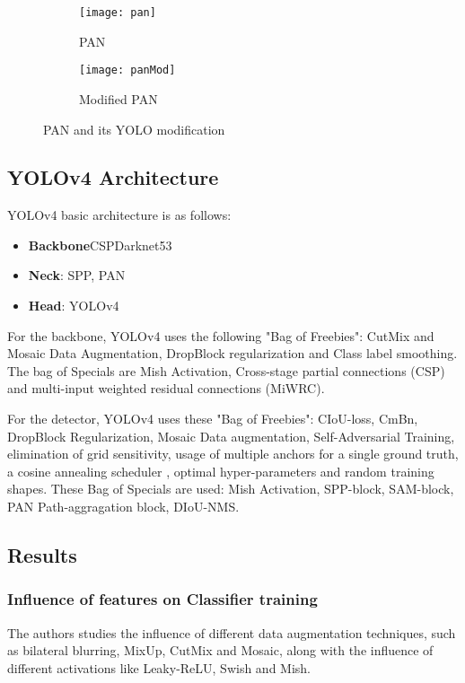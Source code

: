 \begin{figure}[H]
     \centering
     \begin{subfigure}[b]{0.3\textwidth}
         \centering
         \texttt{[image: pan]}
         \caption{PAN}
         \label{fig:pan}
     \end{subfigure}
     \begin{subfigure}[b]{0.3\textwidth}
         \centering
         \texttt{[image: panMod]}
         \caption{Modified PAN}
         \label{fig:panmod}
     \end{subfigure}
   \caption{PAN and its YOLO modification}
   \label{fig:PAN}
\end{figure}
\subsection{YOLOv4 Architecture}
YOLOv4 basic architecture is as follows:
\begin{itemize}
	\item \textbf{Backbone}CSPDarknet53\cite{CSPDarknet53}
	\item \textbf{Neck}: SPP, PAN
	\item \textbf{Head}: YOLOv4
\end{itemize}

 
For the backbone, YOLOv4 uses the following "Bag of Freebies": CutMix and Mosaic Data Augmentation, DropBlock regularization and Class label smoothing. The bag of Specials are Mish Activation, Cross-stage partial connections (CSP) and multi-input weighted residual connections (MiWRC).

For the detector, YOLOv4 uses these "Bag of Freebies": CIoU-loss, CmBn, DropBlock Regularization, Mosaic Data augmentation, Self-Adversarial Training, elimination of grid sensitivity, usage of multiple anchors for a single ground truth, a cosine annealing scheduler \cite{cosineSchedule}, optimal hyper-parameters and random training shapes. These Bag of Specials are used: Mish Activation, SPP-block, SAM-block, PAN Path-aggragation block, DIoU-NMS.

\subsection{Results}
\subsubsection{Influence of features on Classifier training}
The authors studies the influence of different data augmentation techniques, such as bilateral blurring, MixUp, CutMix and Mosaic, along with the influence of different activations like Leaky-ReLU, Swish and Mish.

